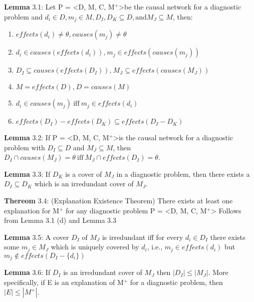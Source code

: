 \documentclass{article}
\begin{document}
\par 
\textbf{Lemma} 3.1: Let P = \textless D, M, C, M$^{+}$\textgreater be the causal
network for a diagnostic problem and $d_i \in D, m_j \in M, D_I, D_K \subseteq
D, \text{and} M_J \subseteq M$, then:
\begin{enumerate}[label={(\alph*)}]
  \item $effects(d_i) \neq \theta\text{,}\  causes(m_j) \neq \theta$
  \item $d_i \in causes(effects(d_i))\text{,}\ m_j \in effects(causes(m_j))$
  \item $D_I \subseteq causes(effects(D_I))\text{,}\ M_J \subseteq
  effects(causes(M_J))$
  \item $M = effects(D)\text{,}\ D = causes(M)$
  \item $d_i \in causes(m_j)\  \text{iff}\  m_j \in effects(d_i)$
  \item $effects(D_I) - effects(D_K) \subseteq effects(D_I - D_K)$
\end{enumerate}

\par 
\textbf{Lemma} 3.2: If P = \textless D, M, C, M$^{+}$\textgreater is the causal
network for a diagnostic problem with $D_I \subseteq D$ and $M_J \subseteq M$,
then $D_I \cap causes(M_J) = \theta\ \text{iff}\ M_J \cap effects(D_I) =
\theta$.
\newline

\par 
\textbf{Lemma} 3.3: If $D_K$ is a cover of $M_J$ in a diagnostic problem, then
there exists a $D_I \subseteq D_K$ which is an irredundant cover of $M_J$.
\newline

\par 
\textbf{Thereom} 3.4: (Explanation Existence Theorem) There exists at least one
explanation for M$^{+}$ for any diagnostic problem P = \textless D, M, C,
M$^{+}$\textgreater
\newline
Follows from Lemma 3.1 (d) and Lemma 3.3
\newline

\par 
\textbf{Lemma} 3.5: A cover $D_I$ of $M_J$ is irredundant iff for every $d_i
\in D_I$ there exists some $m_j \in M_J$ which is uniquely covered by $d_i$,
i.e., $m_j \in effects(d_i)$ but $m_j \not\in effects(D_I - \{d_i\} )$
\newline

\par 
\textbf{Lemma} 3.6: If $D_I$ is an irredundant cover of $M_J$ then $|D_I| \leq
|M_J|$. More specifically, if E is an explanation of M$^{+}$ for a diagnostic
problem, then $|E| \leq |M^{+}|$.
\newline
\end{document}
